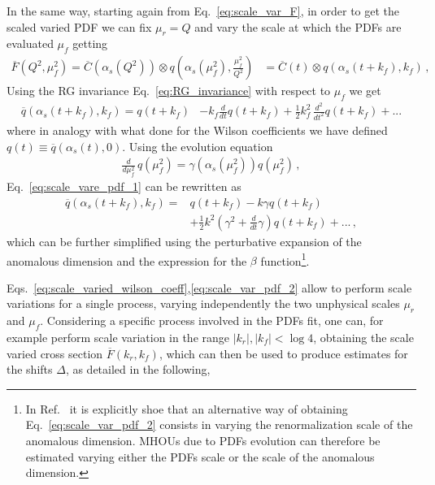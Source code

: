 %
In the same way, starting again from Eq.~\ref{eq:scale_var_F}, in order to get the 
scaled varied PDF we can fix $\mu_r=Q$
and vary the scale at which the PDFs are evaluated $\mu_f$ getting
\begin{align}
    \overline{F}\left(Q^2,\mu_f^2\right) = 
    \overline{C}\left(\alpha_s\left(Q^2\right)\right)\otimes q\left(\alpha_s\left(\mu_f^2\right),\frac{\mu_f^2}{Q^2}\right) 
    &=\overline{C}\left(t\right)\otimes q\left(\alpha_s\left(t+k_f\right),k_f\right)\,,
\end{align}
Using the RG invariance Eq.~\ref{eq:RG_invariance} with respect to $\mu_f$ we get 
\begin{align}
    \label{eq:scale_vare_pdf_1}
    \overline{q}\left(\alpha_s\left(t+k_f\right),k_f\right) = q\left(t+k_f\right) &-  k_f\frac{d}{dt}q\left(t+k_f\right) 
    + \frac{1}{2} k_f^2\,\frac{d^2}{dt^2}q\left(t+k_f\right) + ...
\end{align}
where in analogy with what done for the Wilson coefficients we have defined 
$q\left(t\right) \equiv \overline{q}\left(\alpha_s\left(t\right),0\right)$.
Using the evolution equation
\begin{align}
    \frac{d}{d\mu_f^2}\, q\left(\mu_f^2\right) = \gamma\left(\alpha_s\left(\mu_f^2\right)\right)q\left(\mu_f^2\right)\,,
\end{align}
Eq.~\ref{eq:scale_vare_pdf_1} can be rewritten as 
\begin{align}
    \label{eq:scale_var_pdf_2}
    \overline{q}\left(\alpha_s\left(t+k_f\right),k_f\right) = &q\left(t+k_f\right) - k\gamma q\left(t+k_f\right) \nonumber\\
    &+ \frac{1}{2}k^2\left(\gamma^2 + \frac{d}{dt}\gamma\right)q\left(t+k_f\right) + ...\,,
\end{align}
which can be further simplified using the perturbative expansion of the anomalous dimension
and the expression for the $\beta$ function\footnote{In Ref.~\cite{AbdulKhalek:2019ihb} it is explicitly shoe that an 
alternative way of obtaining Eq.~\ref{eq:scale_var_pdf_2} consists in varying the renormalization scale of the anomalous dimension.
MHOUs due to PDFs evolution can therefore be estimated varying either the PDFs scale or the scale of the anomalous dimension.}.

%
Eqs.~\ref{eq:scale_varied_wilson_coeff},\ref{eq:scale_var_pdf_2} allow to perform scale variations for a single process,
varying independently the two unphysical scales $\mu_r$ and $\mu_f$. 
Considering a specific process involved in the PDFs fit, one can, for example perform scale variation in the range
$|k_r|, |k_f| < \log 4$, obtaining the scale varied cross section $\overline{F}\left(k_r, k_f\right)$, which can then be used to 
produce estimates for the shifts $\Delta$, as detailed in the following,

